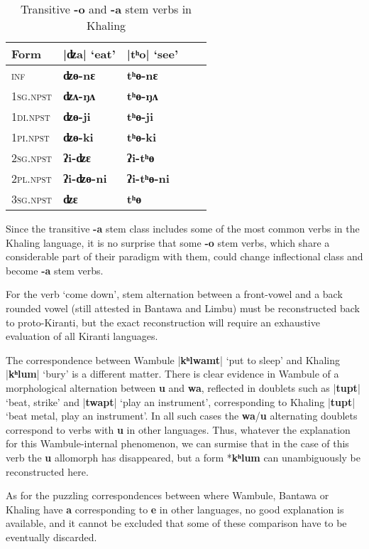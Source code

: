 \documentclass[oneside,a4paper,11pt]{article}
\newcommand{\ipa}[1]{\textbf{{\phon\mbox{#1}}}} %
\newcommand{\grise}[1]{\cellcolor{lightgray}\textbf{#1}}
\newcommand{\dhatu}[2]{|\ipa{#1}| `#2'}
\begin{document}
\begin{table}[H]
\caption{Transitive \ipa{-o} and \ipa{-a} stem verbs in Khaling} \centering \label{tab:a.o}
\begin{tabular}{lllll}
\toprule
Form &\dhatu{ʣa}{eat} & \dhatu{tʰo}{see} \\
\midrule
\textsc{inf} & \ipa{ʣɵ-nɛ} \grise{}& \ipa{tʰɵ-nɛ} \grise{}\\
\textsc{1sg.npst} & \ipa{ʣʌ-ŋʌ} & \ipa{tʰɵ-ŋʌ} \\
\textsc{1di.npst} & \ipa{ʣɵ-ji} \grise{}& \ipa{tʰɵ-ji} \grise{}\\
\textsc{1pi.npst} & \ipa{ʣɵ-ki} \grise{}& \ipa{tʰɵ-ki} \grise{}\\
\textsc{2sg.npst} & \ipa{ʔi-ʣɛ} & \ipa{ʔi-tʰɵ} \\
\textsc{2pl.npst} & \ipa{ʔi-ʣɵ-ni} \grise{}& \ipa{ʔi-tʰɵ-ni} \grise{}\\
\textsc{3sg.npst} & \ipa{ʣɛ} & \ipa{tʰɵ} \\
\bottomrule
\end{tabular}
\end{table}

Since the transitive  \ipa{-a} stem class includes some of the most common verbs in the Khaling language, it is no surprise that some \ipa{-o} stem verbs, which share a considerable part of their paradigm with them, could change inflectional class and become  \ipa{-a} stem verbs.

For the verb `come down', stem alternation between a front-vowel and a back rounded vowel (still attested in Bantawa and Limbu) must be reconstructed back to proto-Kiranti, but the exact reconstruction will require an exhaustive evaluation of all Kiranti languages.

The correspondence between Wambule \dhatu{kʰlwamt}{put to sleep} and Khaling \dhatu{kʰlum}{bury}  is a different matter. There is clear evidence in Wambule of a morphological alternation between \ipa{u} and \ipa{wa}, reflected in doublets such as \dhatu{tupt}{beat, strike} and \dhatu{twapt}{play an instrument}, corresponding to Khaling  \dhatu{tupt}{beat metal, play an instrument}. In all such cases the \ipa{wa}/\ipa{u} alternating doublets correspond to verbs with \ipa{u} in other languages. Thus, whatever the explanation for this Wambule-internal phenomenon, we can surmise that in the case of this verb the \ipa{u} allomorph has disappeared, but a form *\ipa{kʰlum} can unambiguously be reconstructed here.



As for the puzzling correspondences between where Wambule, Bantawa or Khaling have \ipa{a} corresponding to \ipa{e} in other languages, no good explanation is available, and it cannot be excluded that some of these comparison have to be eventually discarded.
\end{document}
